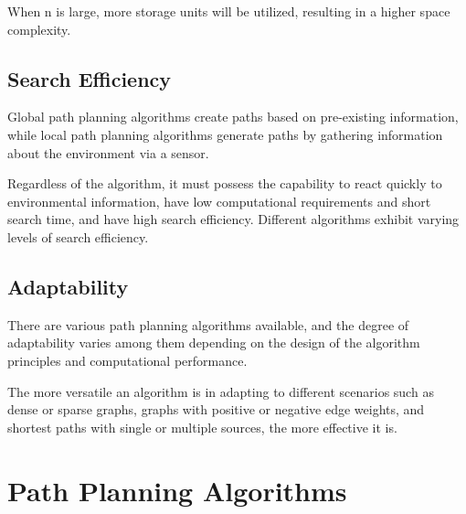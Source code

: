 \documentclass[bibliography=totoc]{scrartcl}
\begin{document}
When n is large, more storage units will be utilized, resulting in a higher space complexity.







\subsection{Search Efficiency}







Global path planning algorithms create paths based on pre-existing information, while local path planning algorithms generate paths by gathering information about the environment via a sensor. 



Regardless of the algorithm, it must possess the capability to react quickly to environmental information, have low computational requirements and short search time, and have high search efficiency. Different algorithms exhibit varying levels of search efficiency. 







\subsection{Adaptability}



There are various path planning algorithms available, and the degree of adaptability varies among them depending on the design of the algorithm principles and computational performance. 



The more versatile an algorithm is in adapting to different scenarios such as dense or sparse graphs, graphs with positive or negative edge weights, and shortest paths with single or multiple sources, the more effective it is. 







\section{Path Planning Algorithms}



\label{path_planning_algorithm}
\end{document}
